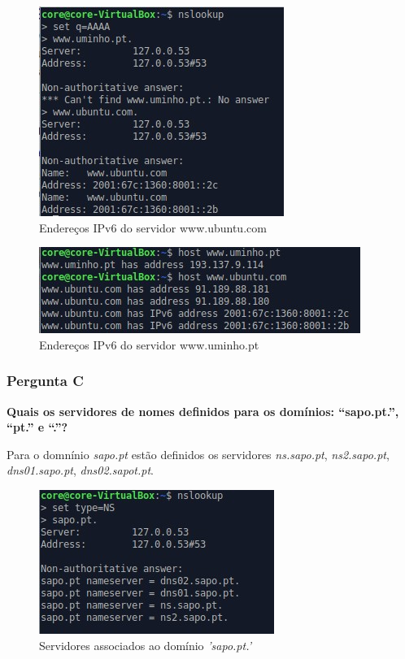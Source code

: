 \documentclass[11pt]{article}
\begin{document}
\begin{figure}[!htb]
    \centering
    \includegraphics[width=.4\textwidth]{images/Parte1/p1_b2.jpg}
    \caption{Endereços IPv6 do servidor www.ubuntu.com}
    \label{fig:ipv6ubuntu}
\end{figure}

\begin{figure}[!htb]
    \centering
    \includegraphics[width=.6\textwidth]{images/Parte1/p1_b.jpg}
    \caption{Endereços IPv6 do servidor www.uminho.pt}
    \label{fig:ipv6ubuntu}
\end{figure}



\subsubsection{Pergunta C}

\textbf{Quais os servidores de nomes definidos para os domínios: “sapo.pt.”, “pt.” e “.”?}

\par Para o domnínio \textit{sapo.pt} estão definidos os servidores \textit{ns.sapo.pt}, \textit{ns2.sapo.pt}, \textit{dns01.sapo.pt}, \textit{dns02.sapot.pt}.

\begin{figure}[!htb]
    \centering
    \includegraphics[width=.4\textwidth]{images/Parte1/p1_c1.jpg}
    \caption{Servidores associados ao domínio \textit{'sapo.pt.'}}
    \label{fig:domsapopt}
\end{figure}
\end{document}
